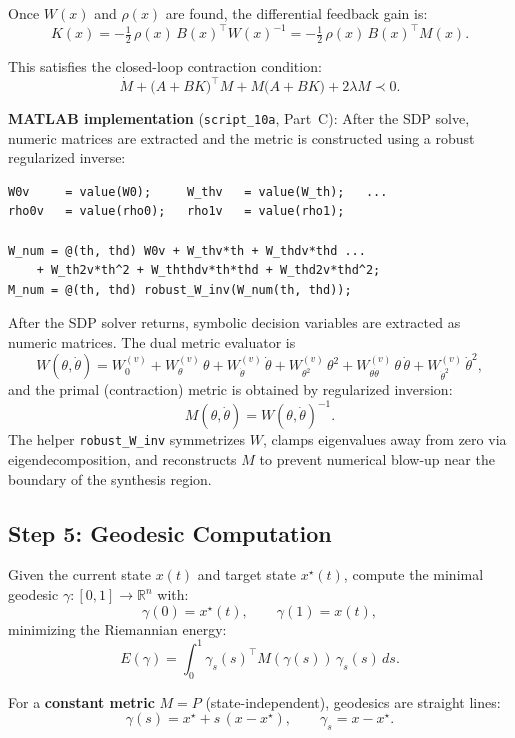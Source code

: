 \documentclass[11pt,a4paper]{article}
\begin{document}
Once \(W(x)\) and \(\rho(x)\) are found, the differential feedback gain is:
\[
K(x) = -\tfrac{1}{2}\,\rho(x)\,B(x)^\top W(x)^{-1} = -\tfrac{1}{2}\,\rho(x)\,B(x)^\top M(x).
\]

This satisfies the closed-loop contraction condition:
\[
\dot M + \bigl(A + BK\bigr)^\top M + M\bigl(A + BK\bigr) + 2\lambda M \prec 0.
\]

\noindent\textbf{MATLAB implementation} (\texttt{script\_10a}, Part~C): After the SDP solve, numeric matrices are extracted and the metric is constructed using a robust regularized inverse:

\begin{lstlisting}
W0v     = value(W0);     W_thv   = value(W_th);   ...
rho0v   = value(rho0);   rho1v   = value(rho1);

W_num = @(th, thd) W0v + W_thv*th + W_thdv*thd ...
    + W_th2v*th^2 + W_ththdv*th*thd + W_thd2v*thd^2;
M_num = @(th, thd) robust_W_inv(W_num(th, thd));
\end{lstlisting}

\begin{codemath}
After the SDP solver returns, symbolic decision variables are extracted as numeric matrices. The dual metric evaluator is
\[
W(\theta,\dot\theta)
=
W_0^{(v)} + W_\theta^{(v)}\,\theta + W_{\dot\theta}^{(v)}\,\dot\theta
+ W_{\theta^2}^{(v)}\,\theta^2
+ W_{\theta\dot\theta}^{(v)}\,\theta\,\dot\theta
+ W_{\dot\theta^2}^{(v)}\,\dot\theta^2,
\]
and the primal (contraction) metric is obtained by regularized inversion:
\[
M(\theta,\dot\theta) = W(\theta,\dot\theta)^{-1}.
\]
The helper \texttt{robust\_W\_inv} symmetrizes \(W\), clamps eigenvalues away from zero via eigendecomposition, and reconstructs \(M\) to prevent numerical blow-up near the boundary of the synthesis region.
\end{codemath}

\subsection{Step 5: Geodesic Computation}

Given the current state \(x(t)\) and target state \(x^\star(t)\), compute the minimal geodesic \(\gamma : [0,1] \to \mathbb{R}^n\) with:
\[
\gamma(0) = x^\star(t), \qquad \gamma(1) = x(t),
\]
minimizing the Riemannian energy:
\[
E(\gamma) = \int_0^1 \gamma_s(s)^\top M(\gamma(s))\,\gamma_s(s)\,ds.
\]

For a \textbf{constant metric} \(M = P\) (state-independent), geodesics are straight lines:
\[
\gamma(s) = x^\star + s\,(x - x^\star), \qquad \gamma_s = x - x^\star.
\]
\end{document}
